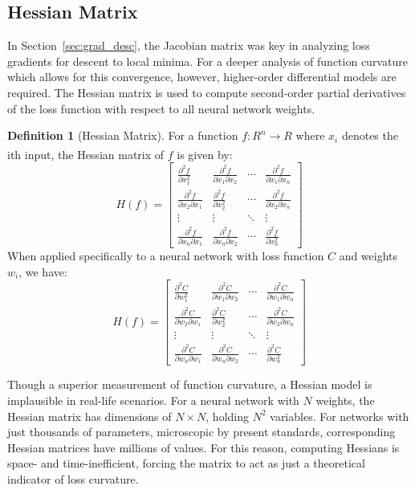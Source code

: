 \documentclass{article}
\theoremstyle{definition}
\newtheorem{definition}{Definition}[section]
\begin{document}
\subsection{Hessian Matrix}
\label{sec:hessian}
In Section~\ref{sec:grad_desc}, the Jacobian matrix was key in analyzing loss gradients for descent to local minima. For a deeper analysis of function curvature which allows for this convergence, however, higher-order differential models are required. The Hessian matrix is used to compute second-order partial derivatives of the loss function with respect to all neural network weights.
\begin{definition}[Hessian Matrix]
\label{hessian}
    For a function $f : R^n \xrightarrow[]{} R$ where $x_i$ denotes the ith input, the Hessian matrix of $f$ is given by:
    \[
        H(f) =
        \begin{bmatrix}
        \frac{\partial^2 f}{\partial x_1^2} & \frac{\partial^2 f}{\partial x_1 \partial x_2} & \cdots & \frac{\partial^2 f}{\partial x_1 \partial x_n} \\
        \frac{\partial^2 f}{\partial x_2 \partial x_1} & \frac{\partial^2 f}{\partial x_2^2} & \cdots & \frac{\partial^2 f}{\partial x_2 \partial x_n} \\
        \vdots & \vdots & \ddots & \vdots \\
        \frac{\partial^2 f}{\partial x_n \partial x_1} & \frac{\partial^2 f}{\partial x_n \partial x_2} & \cdots & \frac{\partial^2 f}{\partial x_n^2}
        \end{bmatrix}
    \]
    When applied specifically to a neural network with loss function $C$ and weights $w_i$, we have:
    \[
        H(f) =
        \begin{bmatrix}
        \frac{\partial^2 C}{\partial w_1^2} & \frac{\partial^2 C}{\partial w_1 \partial w_2} & \cdots & \frac{\partial^2 C}{\partial w_1 \partial w_n} \\
        \frac{\partial^2 C}{\partial w_2 \partial w_1} & \frac{\partial^2 C}{\partial w_2^2} & \cdots & \frac{\partial^2 C}{\partial w_2 \partial w_n} \\
        \vdots & \vdots & \ddots & \vdots \\
        \frac{\partial^2 C}{\partial w_n \partial w_1} & \frac{\partial^2 C}{\partial w_n \partial w_2} & \cdots & \frac{\partial^2 C}{\partial w_n^2}
        \end{bmatrix}
    \]
\end{definition}
Though a superior measurement of function curvature, a Hessian model is implausible in real-life scenarios. For a neural network with $N$ weights, the Hessian matrix has dimensions of $N \times N$, holding $N^2$ variables. For networks with just thousands of parameters, microscopic by present standards, corresponding Hessian matrices have millions of values. For this reason, computing Hessians is space- and time-inefficient, forcing the matrix to act as just a theoretical indicator of loss curvature.
\end{document}
